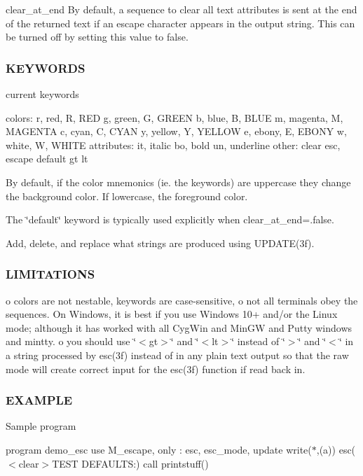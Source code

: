 clear\+\_\+at\+\_\+end By default, a sequence to clear all text attributes is sent at the end of the returned text if an escape character appears in the output string. This can be turned off by setting this value to false. \subsubsection*{K\+E\+Y\+W\+O\+R\+DS}

current keywords

colors\+: r, red, R, R\+ED g, green, G, G\+R\+E\+EN b, blue, B, B\+L\+UE m, magenta, M, M\+A\+G\+E\+N\+TA c, cyan, C, C\+Y\+AN y, yellow, Y, Y\+E\+L\+L\+OW e, ebony, E, E\+B\+O\+NY w, white, W, W\+H\+I\+TE attributes\+: it, italic bo, bold un, underline other\+: clear esc, escape default gt lt

By default, if the color mnemonics (ie. the keywords) are uppercase they change the background color. If lowercase, the foreground color.

The \char`\"{}default\char`\"{} keyword is typically used explicitly when clear\+\_\+at\+\_\+end=.false.

Add, delete, and replace what strings are produced using U\+P\+D\+A\+T\+E(3f).

\subsubsection*{L\+I\+M\+I\+T\+A\+T\+I\+O\+NS}

o colors are not nestable, keywords are case-\/sensitive, o not all terminals obey the sequences. On Windows, it is best if you use Windows 10+ and/or the Linux mode; although it has worked with all Cyg\+Win and Min\+GW and Putty windows and mintty. o you should use \char`\"{}$<$gt$>$\char`\"{} and \char`\"{}$<$lt$>$\char`\"{} instead of \char`\"{}$>$\char`\"{} and \char`\"{}$<$\char`\"{} in a string processed by esc(3f) instead of in any plain text output so that the raw mode will create correct input for the esc(3f) function if read back in.

\subsubsection*{E\+X\+A\+M\+P\+LE}

Sample program

program demo\+\_\+esc use M\+\_\+escape, only \+: esc, esc\+\_\+mode, update write($\ast$,\textquotesingle{}(a)\textquotesingle{}) esc(\textquotesingle{}$<$clear$>$T\+E\+ST D\+E\+F\+A\+U\+L\+TS\+:\textquotesingle{}) call printstuff()

